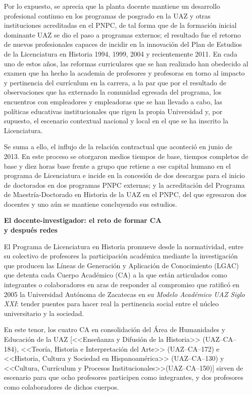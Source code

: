 Por lo expuesto, se aprecia que la planta docente mantiene un desarrollo
profesional continuo en los programas de posgrado en la UAZ y otras
instituciones acreditadas en el PNPC, de tal forma que de la formación
inicial dominante UAZ se dio el paso a programas externos; el resultado fue
el retorno de  nuevos profesionales capaces de incidir en la innovación del
Plan de Estudios de la Licenciatura en Historia 1994, 1999, 2004 y
recientemente 2011.  En cada uno de estos años, las reformas curriculares
que se han realizado han obedecido al examen que ha hecho la academia de
profesores y profesoras en torno al impacto y pertinencia del currículum en
la carrera, a la par que por el resultado de observaciones que ha externado
la comunidad egresada del programa, los encuentros con empleadores y
empleadoras que se han llevado a cabo, las políticas educativas
institucionales que rigen la propia Universidad y, por supuesto, el
escenario contextual nacional y local en el que se ha inscrito la
Licenciatura.

Se suma a ello, el influjo de la relación contractual que aconteció en junio
de 2013. En este proceso se otorgaron medios tiempos de base, tiempos
completos de base y diez horas base frente a grupo que retiene a ese
capital humano en el programa de Licenciatura e incide en la concesión de
dos descargas para el inicio de doctorados en dos programas PNPC externas;
y la acreditación del Programa de Maestría-Doctorado en Historia de la UAZ
en el PNPC, del que egresaron dos docentes y uno aún se mantiene
concluyendo sus estudios.
\newpage

\textbf{El docente-investigador: el reto de formar CA\\ y después redes}

El Programa de Licenciatura en Historia promueve desde la normatividad,
entre su colectivo de profesores la participación académica mediante la
investigación que producen las Líneas de Generación y Aplicación de
Conocimiento (LGAC) que detenta cada Cuerpo Académico (CA) a la que están
articulados como integrantes o colaboradores en aras de responder al
compromiso que ratificó en 2005 la Universidad Autónoma de Zacatecas en su
\textit{Modelo Académico UAZ Siglo XXI}: tender puentes para hacer real la
pertinencia social entre el núcleo universitario y la sociedad. 

\enlargethispage{1\baselineskip}
En este tenor, los cuatro CA en consolidación del Área de Humanidades y
Educación de la UAZ [<<Enseñanza  y Difusión de la Historia>> (UAZ--CA--184),
<<Teoría, Historia e Interpretación del Arte>> (UAZ--CA--172) e <<Historia,
Cultura y Sociedad en Hispanoamérica>> (UAZ--CA--130) y <<Cultura, Currículum y
Procesos Institucionales>>\linebreak (UAZ--CA--150)] sirven de escenario para que ocho
profesores participen como integrantes, y dos profesores como colaboradores
de dichos cuerpos. 
 
